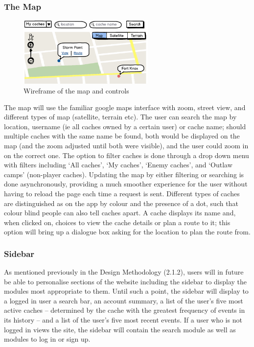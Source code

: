 \subsubsection{The Map}

\begin{figure}
\vspace{-40pt}
	\begin{center}
	\includegraphics[width=0.6\textwidth]{images/map_wireframe}
	\caption{Wireframe of the map and controls}
	\label{map_wireframe}
	\end{center}
	\vspace{-10pt}
\end{figure}

The map will use the familiar google maps interface with zoom, street view, and different types of map (satellite, terrain etc). The user can search the map by location, username (ie all caches owned by a certain user) or cache name; should multiple caches with the same name be found, both would be displayed on the map (and the zoom adjusted until both were visible), and the user could zoom in on the correct one. The option to filter caches is done through a drop down menu with filters including ‘All caches’, ‘My caches’, ‘Enemy caches’, and ‘Outlaw camps’ (non-player caches). Updating the map by either filtering or searching is done asynchronously, providing a much smoother experience for the user without having to reload the page each time a request is sent. Different types of caches are distinguished as on the app by colour and the presence of a dot, such that colour blind people can also tell caches apart. A cache displays its name and, when clicked on, choices to view the cache details or plan a route to it; this option will bring up a dialogue box asking for the location to plan the route from.

\subsubsection{Sidebar}

As mentioned previously in the Design Methodology (2.1.2), users will in future be able to personalise sections of the website including the sidebar to display the modules most appropriate to them. Until such a point, the sidebar will display to a logged in user a search bar, an account summary, a list of the user’s five most active caches – determined by the cache with the greatest frequency of events in its history – and a list of the user’s five most recent events. If a user who is not logged in views the site, the sidebar will contain the search module as well as modules to log in or sign up.

